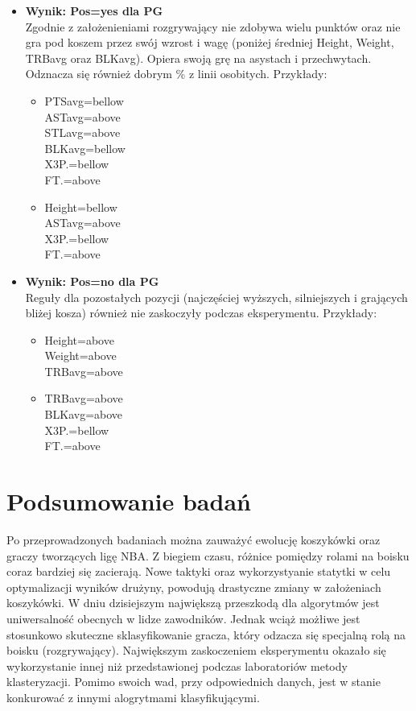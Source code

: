 \documentclass[twoside,twocolumn]{article}
\begin{document}
\begin{itemize}
\item \textbf{Wynik: Pos=yes dla PG}\\
Zgodnie z założenieniami rozgrywający nie zdobywa wielu punktów oraz nie gra pod koszem przez swój wzrost i wagę (poniżej średniej Height, Weight, TRBavg oraz BLKavg). Opiera swoją grę na asystach i przechwytach. Odznacza się również dobrym \% z linii osobitych. Przykłady:
\begin{itemize}
	\item PTSavg=bellow \\ ASTavg=above\\ STLavg=above\\ BLKavg=bellow\\ X3P.=bellow \\ FT.=above \\
	\item Height=bellow \\ ASTavg=above \\ X3P.=bellow \\ FT.=above
\end{itemize}
\end{itemize}

\begin{itemize}
\item \textbf{Wynik: Pos=no dla PG}\\
Reguły dla pozostałych pozycji (najczęściej wyższych, silniejszych i grających bliżej kosza) również nie zaskoczyły podczas eksperymentu. Przykłady:
\begin{itemize}
	\item Height=above \\ Weight=above \\ TRBavg=above \\
	\item TRBavg=above \\ BLKavg=above \\ X3P.=bellow \\ FT.=above
\end{itemize}
\end{itemize}


\section{Podsumowanie badań}

\indent Po przeprowadzonych badaniach można zauważyć ewolucję koszykówki oraz graczy tworzących ligę NBA. Z biegiem czasu, różnice pomiędzy rolami na boisku coraz bardziej się zacierają. Nowe taktyki oraz wykorzystyanie statytki w celu optymalizacji wyników drużyny, powodują drastyczne zmiany w założeniach koszykówki. W dniu dzisiejszym największą przeszkodą dla algorytmów jest uniwersalność obecnych w lidze zawodników. Jednak wciąż możłiwe jest stosunkowo skuteczne sklasyfikowanie gracza, który odzacza się specjalną rolą na boisku (rozgrywający). Największym zaskoczeniem eksperymentu okazało się wykorzystanie innej niż przedstawionej podczas laboratoriów metody klasteryzacji. Pomimo swoich wad, przy odpowiednich danych, jest w stanie konkurować z innymi alogrytmami klasyfikującymi.
\end{document}
